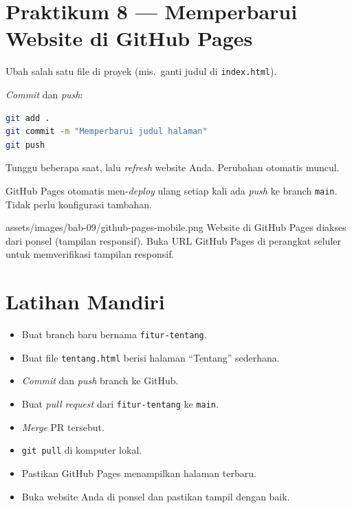 \section{Praktikum 8 --- Memperbarui Website di GitHub Pages}
\label{sec:praktik-update-pages}

\begin{langkah}
  \item Ubah salah satu file di proyek (mis.\ ganti judul di \texttt{index.html}).
  \item \emph{Commit} dan \emph{push}:
\end{langkah}

\begin{lstlisting}[language=bash, caption={Commit dan push pembaruan}, label={lst:git-push-update}]
git add .
git commit -m "Memperbarui judul halaman"
git push
\end{lstlisting}

\begin{langkah}
  \item Tunggu beberapa saat, lalu \emph{refresh} website Anda. Perubahan otomatis muncul.
\end{langkah}

\begin{catatan}
GitHub Pages otomatis men-\emph{deploy} ulang setiap kali ada \emph{push} ke branch \texttt{main}. Tidak perlu konfigurasi tambahan.
\end{catatan}

\begin{tangkapanlayar}
  {assets/images/bab-09/github-pages-mobile.png}
  {Website di GitHub Pages diakses dari ponsel (tampilan responsif).}
  {Buka URL GitHub Pages di perangkat seluler untuk memverifikasi tampilan responsif.}
\end{tangkapanlayar}

\section{Latihan Mandiri}
\label{sec:pr-latihan}

\begin{latihan}
\begin{itemize}
  \item Buat branch baru bernama \texttt{fitur-tentang}.
  \item Buat file \texttt{tentang.html} berisi halaman ``Tentang'' sederhana.
  \item \emph{Commit} dan \emph{push} branch ke GitHub.
  \item Buat \emph{pull request} dari \texttt{fitur-tentang} ke \texttt{main}.
  \item \emph{Merge} PR tersebut.
  \item \texttt{git pull} di komputer lokal.
  \item Pastikan GitHub Pages menampilkan halaman terbaru.
  \item Buka website Anda di ponsel dan pastikan tampil dengan baik.
\end{itemize}
\end{latihan}

